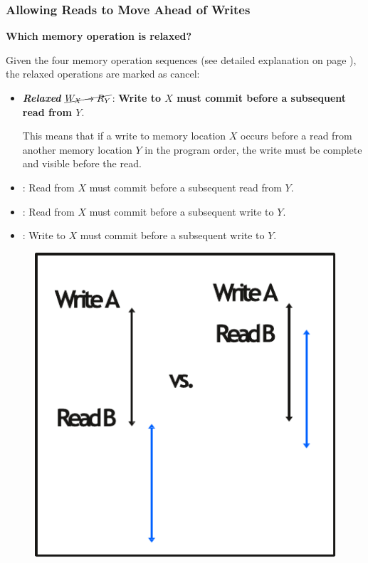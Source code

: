 \newpage

\subsubsection{Allowing Reads to Move Ahead of Writes}

\begin{flushleft}
    \textcolor{Green3}{ \textbf{Which memory operation is relaxed?}}
\end{flushleft}
Given the four memory operation sequences (see detailed explanation on page ), the relaxed operations are marked as cancel:
\begin{itemize}
    \item[\textcolor{Green3}{\faIcon{check}}] \textcolor{Green3}{\textbf{\emph{Relaxed}} $\cancel{W_{X} \rightarrow R_{Y}}$}: \textbf{Write to $X$ must commit before a subsequent read from $Y$}.

    This means that if a write to memory location $X$ occurs before a read from another memory location $Y$ in the program order, the write must be complete and visible before the read.


    \item[\textcolor{Red2}{\faIcon{times}}] : Read from $X$ must commit before a subsequent read from $Y$.
    \item[\textcolor{Red2}{\faIcon{times}}] : Read from $X$ must commit before a subsequent write to $Y$.
    \item[\textcolor{Red2}{\faIcon{times}}] : Write to $X$ must commit before a subsequent write to $Y$.
\end{itemize}
\begin{figure}[!htp]
    \centering
    \includegraphics[width=.4\textwidth]{img/tso-and-pc-1.pdf}
\end{figure}

